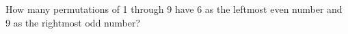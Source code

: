 How many permutations of 1 through 9 have 6 as the leftmost even number and 9 as the rightmost odd number?
